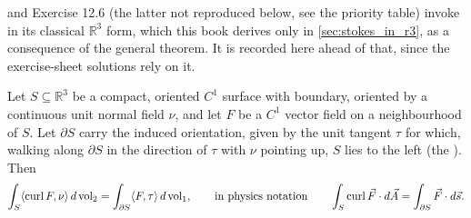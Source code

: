 \begin{ainote}
 and Exercise 12.6 (the latter not reproduced below, see the priority table)
invoke  in its classical $\mathbb{R}^3$ form, which this book derives
only in \cref{sec:stokes_in_r3}, as a consequence of the general theorem. It is recorded here
ahead of that, since the exercise-sheet solutions rely on it.
\end{ainote}

\begin{theorem}
\label{thm:stokes_classical}
Let $S \subseteq \mathbb{R}^3$ be a compact, oriented $C^1$ surface with boundary, oriented by a
continuous unit normal field $\nu$, and let $F$ be a $C^1$ vector field on a neighbourhood of
$S$. Let $\partial S$ carry the induced orientation, given by the unit tangent $\tau$ for which,
walking along $\partial S$ in the direction of $\tau$ with $\nu$ pointing up, $S$ lies to the
left (the ). Then
\[\int_S \langle\operatorname{curl} F,\nu\rangle\,d\operatorname{vol}_2 = \int_{\partial S} \langle F,\tau\rangle\,d\operatorname{vol}_1,
  \qquad\text{in physics notation}\qquad
  \int_S \operatorname{curl} \vec F \cdot d\vec A = \int_{\partial S} \vec F \cdot d\vec s.\]
\end{theorem}
